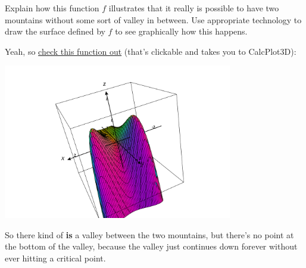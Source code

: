 \documentclass[10pt]{article}
\newenvironment{red}{\color{red}}{\ignorespacesafterend}
\begin{document}
\begin{enumerate}[leftmargin=0pt]
    Explain how this function $f$ illustrates that it really is possible to have two mountains without some sort of valley in between. Use appropriate technology to draw the surface defined by $f$ to see graphically how this happens.
    
    \begin{red}
    Yeah, so \href{https://www.monroecc.edu/faculty/paulseeburger/calcnsf/CalcPlot3D/?type=z;z=4x^2e^y-2x^4-e^(4y);visible=true;umin=-2;umax=2;vmin=-2;vmax=2;grid=50;format=normal;alpha=-1;constcol=rgb(255,0,0);view=0;contourcolor=red;fixdomain=false&type=window;hsrmode=3;nomidpts=true;anaglyph=-1;center=2.507369696231452,8.657081705234903,4.332208854072867,1;focus=0,0,0,1;up=-0.3279946341240409,-0.34507444582480573,0.8793993102251901,1;transparent=false;alpha=140;twoviews=false;unlinkviews=false;axisextension=0.7;xaxislabel=x;yaxislabel=y;zaxislabel=z;edgeson=true;faceson=true;showbox=true;showaxes=true;showticks=true;perspective=true;centerxpercent=0.5;centerypercent=0.5;rotationsteps=30;autospin=true;xygrid=false;yzgrid=false;xzgrid=false;gridsonbox=true;gridplanes=false;gridcolor=rgb(128,128,128);xmin=-2;xmax=2;ymin=-2;ymax=2;zmin=-2;zmax=2;xscale=1;yscale=1;zscale=1;zcmin=-4;zcmax=4;zoom=0.886667;xscalefactor=1;yscalefactor=1;zscalefactor=1}{check this function out} (that's clickable and takes you to CalcPlot3D):
    
    \begin{center}
        \includegraphics[width=0.75\textwidth]{CalcPlot3D-plot.png}
    \end{center}
    
    So there kind of \textbf{is} a valley between the two mountains, but there's no point at the bottom of the valley, because the valley just continues down forever without ever hitting a critical point.
    \end{red}
    

\end{enumerate}
\end{document}
